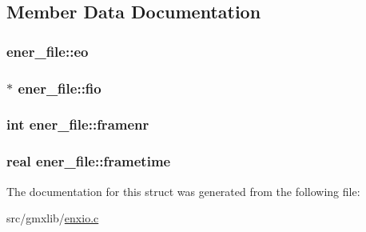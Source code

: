 \subsection{\-Member \-Data \-Documentation}
\hypertarget{structener__file_a08eb6b1ad9c5e776d78050a6e5ff5e26}{
\subsubsection[{eo}]{ {\bf ener\-\_\-file\-::eo}}}\label{structener__file_a08eb6b1ad9c5e776d78050a6e5ff5e26}
\hypertarget{structener__file_ad86392bac9dc78c6adaae65a967bcd9f}{
\subsubsection[{fio}]{$\ast$ {\bf ener\-\_\-file\-::fio}}}\label{structener__file_ad86392bac9dc78c6adaae65a967bcd9f}
\hypertarget{structener__file_a1bb3f5202def84cf2be9a2790622a2b0}{
\subsubsection[{framenr}]{\setlength{\rightskip}{0pt plus 5cm}int {\bf ener\-\_\-file\-::framenr}}}\label{structener__file_a1bb3f5202def84cf2be9a2790622a2b0}
\hypertarget{structener__file_a22a2b7e31ce256db50317203e6634c81}{
\subsubsection[{frametime}]{\setlength{\rightskip}{0pt plus 5cm}real {\bf ener\-\_\-file\-::frametime}}}\label{structener__file_a22a2b7e31ce256db50317203e6634c81}


\-The documentation for this struct was generated from the following file\-:\begin{DoxyCompactItemize}
\item 
src/gmxlib/\hyperlink{enxio_8c}{enxio.\-c}\end{DoxyCompactItemize}
